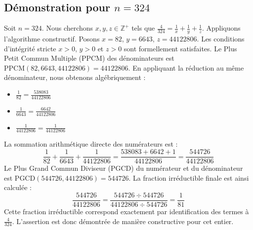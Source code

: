 \documentclass[11pt,a4paper]{article}
\begin{document}
\subsection{Démonstration pour $n = 324$}
Soit $n = 324$. Nous cherchons $x, y, z \in \mathbb{Z}^{+}$ tels que $\frac{4}{324} = \frac{1}{x} + \frac{1}{y} + \frac{1}{z}$.
Appliquons l'algorithme constructif. Posons $x = 82$, $y = 6643$, $z = 44122806$.
Les conditions d'intégrité stricte $x > 0$, $y > 0$ et $z > 0$ sont formellement satisfaites.
Le Plus Petit Commun Multiple (PPCM) des dénominateurs est $\text{PPCM}(82, 6643, 44122806) = 44122806$.
En appliquant la réduction au même dénominateur, nous obtenons algébriquement :
\begin{itemize}
    \item $\frac{1}{82} = \frac{538083}{44122806}$
    \item $\frac{1}{6643} = \frac{6642}{44122806}$
    \item $\frac{1}{44122806} = \frac{1}{44122806}$
\end{itemize}
La sommation arithmétique directe des numérateurs est :
$$ \frac{1}{82} + \frac{1}{6643} + \frac{1}{44122806} = \frac{538083 + 6642 + 1}{44122806} = \frac{544726}{44122806} $$
Le Plus Grand Commun Diviseur (PGCD) du numérateur et du dénominateur est $\text{PGCD}(544726, 44122806) = 544726$.
La fraction irréductible finale est ainsi calculée :
$$ \frac{544726}{44122806} = \frac{544726 \div 544726}{44122806 \div 544726} = \frac{1}{81} $$
Cette fraction irréductible correspond exactement par identification des termes à $\frac{4}{324}$. L'assertion est donc démontrée de manière constructive pour cet entier.
\end{document}
